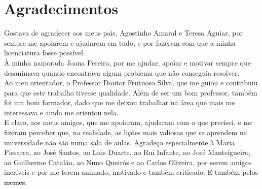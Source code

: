 \chapter{Agradecimentos}
\label{chap:agradecimentos}

Gostava de agradecer aos meus pais, Agostinho Amaral e Teresa Aguiar, por sempre me apoiarem e ajudarem em tudo, e por fazerem com que a minha licenciatura fosse possível. \\

À minha namorada Joana Pereira, por me ajudar, apoiar e motivar sempre que desanimava quando encontrava algum problema que não conseguia resolver. \\

Ao meu orientador, o Professor Doutor Frutuoso Silva, que me guiou e contribuiu para que este trabalho tivesse qualidade. Além de ser um bom professor, também foi um bom formador, dado que me deixou trabalhar na área que mais me interessava e ainda me orientou nela.\\

E claro, aos meus amigos, que me apoiaram, ajudaram com o que precisei, e me fizeram perceber que, na realidade, as lições mais valiosas que se aprendem na universidade não são numa sala de aulas. Agradeço especialmente à Maria Pissarra, ao José Santos, ao Luis Duarte, ao Rui Infante, ao José Manteigueiro, ao Guilherme Catalão, ao Nuno Queirós e ao Carlos Oliveira, por serem amigos incríveis e por me terem  animado, motivado e também criticado. \st{E também pelos memes}.